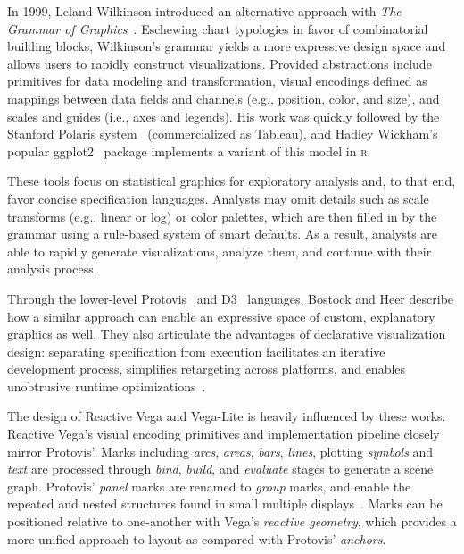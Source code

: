 In 1999, Leland Wilkinson introduced an alternative approach with \emph{The
Grammar of Graphics}~\cite{wilkinson:grammar}. Eschewing chart typologies in
favor of combinatorial building blocks, Wilkinson's grammar yields a more
expressive design space and allows users to rapidly construct visualizations.
Provided abstractions include primitives for data modeling and transformation,
visual encodings defined as mappings between data fields and channels (e.g.,
position, color, and size), and scales and guides (i.e., axes and legends). His
work was quickly followed by the Stanford Polaris system~\cite{stolte:polaris}
(commercialized as Tableau), and Hadley Wickham's popular
ggplot2~\cite{wickham:layered} package implements a variant of this model in
\textsc{r}.

These tools focus on statistical graphics for exploratory analysis and, to that
end, favor concise specification languages. Analysts may omit details such as
scale transforms (e.g., linear or log) or color palettes, which are then filled
in by the grammar using a rule-based system of smart defaults. As a result,
analysts are able to rapidly generate visualizations, analyze them, and continue
with their analysis process.

Through the lower-level Protovis~\cite{bostock:protovis,heer:protovisjava} and
D3~\cite{bostock:d3} languages, Bostock and Heer describe how a similar approach
can enable an expressive space of custom, explanatory graphics as well. They
also articulate the advantages of declarative visualization design: separating
specification from execution facilitates an iterative development process,
simplifies retargeting across platforms, and enables unobtrusive runtime
optimizations~\cite{heer:protovisjava}.

The design of Reactive Vega and Vega-Lite is heavily influenced by these works.
Reactive Vega's visual encoding primitives and implementation pipeline closely
mirror Protovis'. Marks including \emph{arcs}, \emph{areas}, \emph{bars},
\emph{lines}, plotting \emph{symbols} and \emph{text} are processed through
\emph{bind}, \emph{build}, and \emph{evaluate} stages to generate a scene graph.
Protovis' \emph{panel} marks are renamed to \emph{group} marks, and enable the
repeated and nested structures found in small multiple
displays~\cite{tufte:envisioning}. Marks can be positioned relative to
one-another with Vega's \emph{reactive geometry}, which provides a more unified
approach to layout as compared with Protovis' \emph{anchors}.

